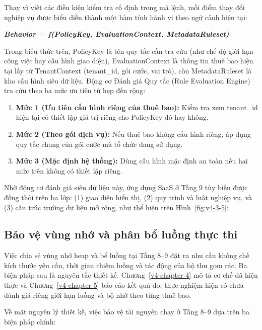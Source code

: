 Thay vì viết các điều kiện kiểm tra cố định trong mã lệnh, mỗi điểm thay đổi nghiệp vụ được biểu diễn thành một hàm tính hành vi theo ngữ cảnh hiện tại:

\textbf{\emph{Behavior = f(PolicyKey, EvaluationContext, MetadataRuleset)}}

Trong biểu thức trên, PolicyKey là tên quy tắc cần tra cứu (như chế độ giới hạn công việc hay cấu hình giao diện), EvaluationContext là thông tin thuê bao hiện tại lấy từ TenantContext (tenant\_\allowbreak{}id, gói cước, vai trò), còn MetadataRuleset là kho cấu hình siêu dữ liệu. Động cơ Đánh giá Quy tắc (Rule Evaluation Engine) tra cứu theo ba mức ưu tiên từ hẹp đến rộng:

\begin{enumerate}
\def\labelenumi{\arabic{enumi}.}
\item
  \textbf{Mức 1 (Ưu tiên cấu hình riêng của thuê bao):} Kiểm tra xem tenant\_\allowbreak{}id hiện tại có thiết lập giá trị riêng cho PolicyKey đó hay không.
\item
  \textbf{Mức 2 (Theo gói dịch vụ):} Nếu thuê bao không cấu hình riêng, áp dụng quy tắc chung của gói cước mà tổ chức đang sử dụng.
\item
  \textbf{Mức 3 (Mặc định hệ thống):} Dùng cấu hình mặc định an toàn nếu hai mức trên không có thiết lập riêng.
\end{enumerate}

Nhờ động cơ đánh giá siêu dữ liệu này, ứng dụng SaaS ở Tầng 9 tùy biến được đồng thời trên ba lớp: (1) giao diện hiển thị, (2) quy trình và luật nghiệp vụ, và (3) cấu trúc trường dữ liệu mở rộng, như thể hiện trên Hình~\ref{fig:v4-3-5}:


\subsection{Bảo vệ vùng nhớ và phân bổ luồng thực thi}\label{v4-sec-3-3-3}

Việc chia sẻ vùng nhớ heap và bể luồng tại Tầng 8--9 đặt ra nhu cầu khống chế kích thước yêu cầu, thời gian chiếm luồng và tác động của bộ thu gom rác. Ba biện pháp sau là nguyên tắc thiết kế. Chương~\ref{v4-chapter-4} mô tả cơ chế đã hiện thực và Chương~\ref{v4-chapter-5} báo cáo kết quả đo; thực nghiệm hiện có chưa đánh giá riêng giới hạn luồng và bộ nhớ theo từng thuê bao.

Về mặt nguyên lý thiết kế, việc bảo vệ tài nguyên chạy ở Tầng 8--9 dựa trên ba biện pháp chính:

